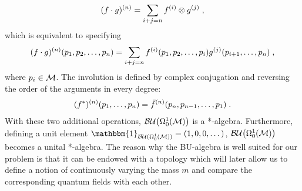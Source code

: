 \begin{align}
	(f\cdot g)^{(n)} = \sum_{i+j = n} f^{(i)} \otimes g^{(j)} \;,
\end{align}
which is equivalent to specifying
\begin{align}
(f\cdot g)^{(n)} (p_1,p_2, \dots , p_n) = \sum_{i+j = n} f^{(i)} (p_1, p_2, \dots , p_i) g^{(j)} (p_{i+1} , \dots , p_n) \;,
\end{align}
where $p_i \in \mathcal{M}$. The involution is defined by complex conjugation and reversing the order of the arguments in every degree:
\begin{align}
	(f^*)^{(n)} (p_1, \dots , p_n) = \bar{f}^{(n)}(p_n, p_{n-1}, \dots , p_1) \;.
\end{align}
With these two additional operations, ${\mathcal{BU}\big(\Omega^1_0(\mathcal{M})\big)}$ is a *-algebra. Furthermore, defining a unit element $\mathbbm{1}_{\BU(\Omega^1_0(\M))} = (1, 0, 0, \dots)$, ${\mathcal{BU}\big(\Omega^1_0(\mathcal{M})\big)}$ becomes a unital *-algebra. The reason why the BU-algebra is well suited for our problem is that it can be endowed with a topology which will later allow us to define a notion of continuously varying the mass $m$ and compare the corresponding quantum fields with each other.
%
%
%
%
%
